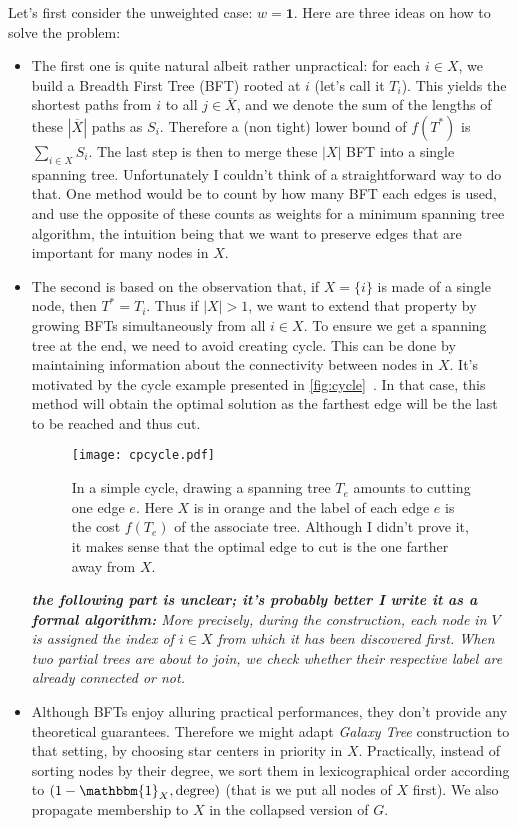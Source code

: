 \documentclass[a4paper,final,notitlepage,11pt,svgnames]{scrartcl}
\newcommand{\stcomp}[1]{\ensuremath{\overline{#1}}}
\begin{document}
Let's first consider the unweighted case: $w=\boldsymbol{1}$. Here are three
ideas on how to solve the problem:
\begin{itemize}

	\item The first one is quite natural albeit rather unpractical: for each $i
		\in X$, we build a Breadth First Tree (BFT) rooted at $i$ (let's call
		it $T_i$). This yields the shortest paths from $i$ to all $j \in
		\stcomp{X}$, and we denote the sum of the lengths of these
		$|\stcomp{X}|$ paths as $S_i$.  Therefore a (non tight) lower bound of
		$f(T^*)$ is $\sum_{i\in X} S_i$.  The last step is then to merge these
		$|X|$ BFT into a single spanning tree. Unfortunately I couldn't think
		of a straightforward way to do that. One method would be to count by
		how many BFT each edges is used, and use the opposite of these counts
		as weights for a minimum spanning tree algorithm, the intuition being
		that we want to preserve edges that are important for many nodes in
		$X$.

	\item The second is based on the observation that, if $X = \{i\}$ is made of
		a single node, then $T^* = T_i$. Thus if $|X| > 1$, we want to
		extend that property by growing BFTs simultaneously from all $i \in X$.
		To ensure we get a spanning tree at the end, we need to avoid creating
		cycle. This can be done by maintaining information about the
		connectivity between nodes in $X$. It's motivated by the cycle example
		presented in \autoref{fig:cycle}~. In that case,
		this method will obtain the optimal solution as the farthest edge will
		be the last to be reached and thus cut.

		\begin{figure}[hbp]
			\centering
			\texttt{[image: cpcycle.pdf]}
			\caption{In a simple cycle, drawing a spanning tree $T_e$ amounts
				to cutting one edge $e$. Here $X$ is in orange and the label of
				each edge $e$ is the cost $f(T_e)$ of the associate tree.
				Although I didn't prove it, it makes sense that the
				optimal edge to cut is the one farther away from $X$. \label{fig:cycle}}
		\end{figure}

		\emph{\textbf{the following part is unclear; it's probably better I
		write it as a formal algorithm:} More precisely, during the
		construction, each node in $V$ is assigned the index of $i \in X$ from
		which it has been discovered first. When two partial trees are about to
		join, we check whether their respective label are already connected or
		not.}

	\item Although BFTs enjoy alluring practical performances, they don't
		provide any theoretical guarantees. Therefore we might adapt
		\emph{Galaxy Tree} construction to that setting, by choosing star
		centers in priority in $X$. Practically, instead of sorting nodes by
		their degree, we sort them in lexicographical order according to $(1 -
		\mathbbm{1}_X, \textrm{degree})$ (that is we put all nodes of $X$
		first). We also propagate membership to $X$ in the collapsed version of
		$G$.

\end{itemize}

\end{document}
